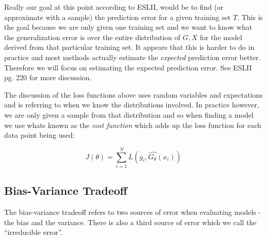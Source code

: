 Really our goal at this point according to ESLII, would be to find (or approximate with a sample) the prediction error for a given training set $T$. This is the goal because we are only given one training set and we want to know what the generalization error is over the entire distribution of $G, X$ for the model derived from that particular training set. It appears that this is harder to do in practice and most methods actually estimate the \emph{expected} prediction error better. Therefore we will focus on estimating the expected prediction error. See ESLII pg. 220 for more discussion.

The discussion of the loss functions above uses random variables and expectations and is referring to when we know the distributions involved. In practice however, we are only given a sample from that distribution and so when finding a model we use whats known as the \emph{cost function} which adds up the loss function for each data point being used:

\begin{equation}
J(\theta) = \sum_{i=1}^{N}{L(g_i, \hat{G_\theta}(x_i))}
\end{equation}




\subsection{Bias-Variance Tradeoff}

The bias-variance tradeoff refers to two sources of error when evaluating models - the bias and the variance. There is also a third source of error which we call the ``irreducible error''. 

